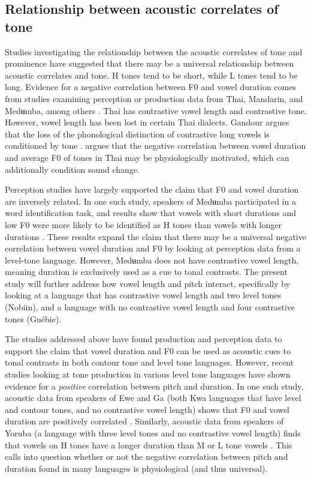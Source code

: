 \documentclass[output=paper]{langscibook}
\begin{document}
\subsection{Relationship between acoustic correlates of tone}
Studies investigating the relationship between the acoustic correlates of tone and prominence have suggested that there may be a universal relationship between acoustic correlates and tone. H tones tend to be short, while L tones tend to be long. Evidence for a negative correlation between F0 and vowel duration comes from studies examining perception or production data from Thai, Mandarin, and Medʉmba, among others \citep{gandour1977interaction, dreher1968instrumental, franich2016internal}. Thai has contrastive vowel length and contrastive tone. However, vowel length has been lost in certain Thai dialects. Gandour argues that the loss of the phonological distinction of contrastive long vowels is conditioned by tone \citep{gandour1977interaction}. \cite{gandour1977interaction} argues that the negative correlation between vowel duration and average F0 of tones in Thai may be physiologically motivated, which can additionally condition sound change. 

Perception studies have largely supported the claim that F0 and vowel duration are inversely related. In one such study, speakers of Medʉmba participated in a word identification task, and results show that vowels with short durations and low F0 were more likely to be identified as H tones than vowels with longer durations \citep{franich2016internal}. These results expand the claim that there may be a universal negative correlation between vowel duration and F0 by looking at perception data from a level-tone language. However, Medʉmba does not have contrastive vowel length, meaning duration is exclusively used as a cue to tonal contrasts. The present study will further address how vowel length and pitch interact, specifically by looking at a language that has contrastive vowel length and two level tones (Nobiin), and a language with no contrastive vowel length and four contrastive tones (Guébie).

The studies addressed above have found production and perception data to support the claim that vowel duration and F0 can be used as acoustic cues to tonal contrasts in both contour tone and level tone languages. However, recent studies looking at tone production in various level tone languages have shown evidence for a \textit{positive} correlation between pitch and duration. In one such study, acoustic data from speakers of Ewe and Ga (both Kwa languages that have level and contour tones, and no contrastive vowel length) shows that F0 and vowel duration are positively correlated \citep{Kpodo2018}. Similarly, acoustic data from speakers of Yoruba (a language with three level tones and no contrastive vowel length) finds that vowels on H tones have a longer duration than M or L tone vowels \citep{Mamadou2018}. This calls into question whether or not the negative correlation between pitch and duration found in many languages is physiological (and thus universal).
\end{document}
